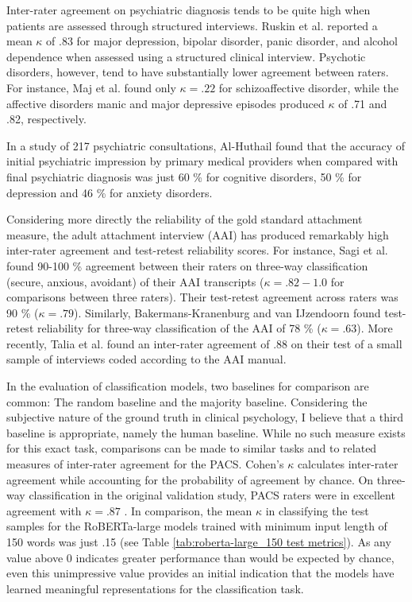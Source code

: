 \documentclass[12pt]{report}
\begin{document}
Inter-rater agreement on psychiatric diagnosis tends to be quite high when patients are assessed through structured interviews.
Ruskin et al. \citeyear{Ruskin1998} reported a mean $\kappa$ of .83 for major depression, bipolar disorder, panic disorder, and alcohol dependence when assessed using a structured clinical interview.
Psychotic disorders, however, tend to have substantially lower agreement between raters.
For instance, Maj et al. \citeyear{Maj2000} found only $\kappa = .22$ for schizoaffective disorder, while the affective disorders manic and major depressive episodes produced $\kappa$ of .71 and .82, respectively.

In a study of 217 psychiatric consultations, Al-Huthail \citeyear{Al-Huthail2008} found that the accuracy of initial psychiatric impression by primary medical providers when compared with final psychiatric diagnosis was just 60 \% for cognitive disorders, 50 \% for depression and 46 \% for anxiety disorders.

Considering more directly the reliability of the gold standard attachment measure, the adult attachment interview (AAI) has produced remarkably high inter-rater agreement and test-retest reliability scores.
For instance, Sagi et al. \citeyear{Sagi1994} found 90-100 \% agreement between their raters on three-way classification (secure, anxious, avoidant) of their AAI transcripts ($\kappa = .82 - 1.0$ for comparisons between three raters). Their test-retest agreement across raters was 90 \% ($\kappa = .79$).
Similarly, Bakermans-Kranenburg and van IJzendoorn \citeyear{BakermansKranenburg1993} found test-retest reliability for three-way classification of the AAI of 78 \% ($\kappa = .63$).
More recently, Talia et al. \citeyear{Talia2020} found an inter-rater agreement of .88 on their test of a small sample of interviews coded according to the AAI manual.

In the evaluation of classification models, two baselines for comparison are common: The random baseline and the majority baseline.
Considering the subjective nature of the ground truth in clinical psychology, I believe that a third baseline is appropriate, namely the human baseline.
While no such measure exists for this exact task, comparisons can be made to similar tasks and to related measures of inter-rater agreement for the PACS.
Cohen's $\kappa$ calculates inter-rater agreement while accounting for the probability of agreement by chance.
On three-way classification in the original validation study, PACS raters were in excellent agreement with $\kappa = .87$ \cite{Talia2017}.
In comparison, the mean $\kappa$ in classifying the test samples for the RoBERTa-large models trained with minimum input length of 150 words was just .15 (see Table \ref{tab:roberta-large_150 test metrics}).
As any value above 0 indicates greater performance than would be expected by chance, even this unimpressive value provides an initial indication that the models have learned meaningful representations for the classification task.
\end{document}
